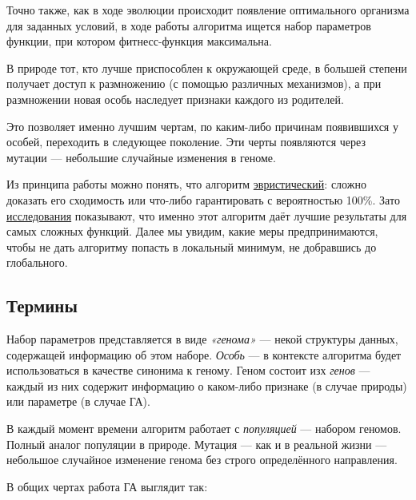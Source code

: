 \documentclass[11pt]{article}
\begin{document}
    Точно также, как в ходе эволюции происходит появление оптимального организма для заданных условий,
    в ходе работы алгоритма ищется набор параметров функции, при котором фитнесс-функция максимальна.

    В природе тот, кто лучше приспособлен к окружающей среде, в большей степени получает доступ к размножению (с помощью различных механизмов),
    а при размножении новая особь наследует признаки каждого из родителей.

    Это позволяет именно лучшим чертам, по каким-либо причинам появившихся у особей, переходить в следующее поколение.
    Эти черты появляются через мутации — небольшие случайные изменения в геноме.

    Из принципа работы можно понять, что алгоритм \href{https://en.wikipedia.org/wiki/Heuristic_(computer_science)}{эвристический}: сложно доказать его сходимость или что-либо гарантировать с вероятностью 100\%.
    Зато \href{talgat.org/news/wp-content/uploads/2018/08/112.pdf}{исследования} показывают, что именно этот алгоритм даёт лучшие результаты для самых сложных функций.
    Далее мы увидим, какие меры предпринимаются, чтобы не дать алгоритму попасть в локальный минимум, не добравшись до глобального.

    \subsection{Термины}
    Набор параметров представляется в виде \textit{«генома»} — некой структуры данных, содержащей информацию об этом наборе.
    \textit{Особь} — в контексте алгоритма будет использоваться в качестве синонима к геному.
    Геном состоит изх \textit{генов} — каждый из них содержит информацию о каком-либо признаке (в случае природы) или параметре (в случае ГА).

    В каждый момент времени алгоритм работает с \textit{популяцией} — набором геномов. Полный аналог популяции в природе.
    Мутация — как и в реальной жизни — небольшое случайное изменение генома без строго определённого направления.

    В общих чертах работа ГА выглядит так:
\end{document}
